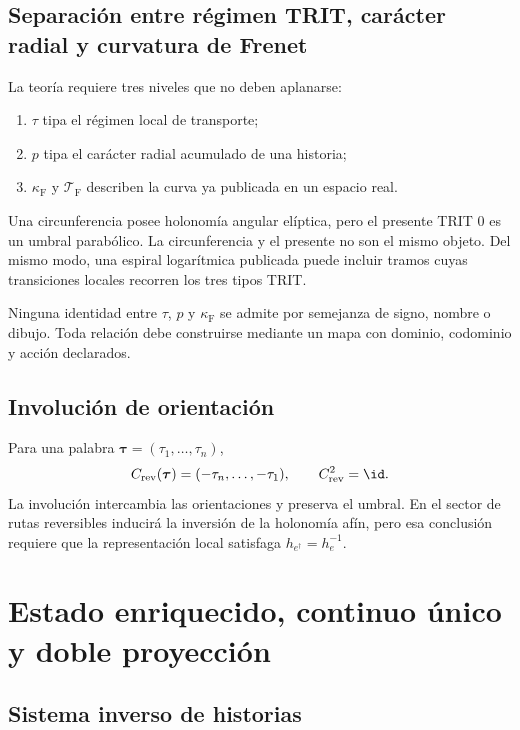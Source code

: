 \section{Separación entre régimen TRIT, carácter radial y curvatura de Frenet}

La teoría requiere tres niveles que no deben aplanarse:
\begin{enumerate}
\item \(\tau\) tipa el régimen local de transporte;
\item \(p\) tipa el carácter radial acumulado de una historia;
\item \(\kappa_{\mathrm{F}}\) y \(\mathcal T_{\mathrm{F}}\) describen la curva ya
publicada en un espacio real.
\end{enumerate}
Una circunferencia posee holonomía angular elíptica, pero el presente TRIT
\(0\) es un umbral parabólico. La circunferencia y el presente no son el
mismo objeto. Del mismo modo, una espiral logarítmica publicada puede incluir
tramos cuyas transiciones locales recorren los tres tipos TRIT.

\begin{principle}
Ninguna identidad entre \(\tau\), \(p\) y \(\kappa_{\mathrm{F}}\) se admite por
semejanza de signo, nombre o dibujo. Toda relación debe construirse mediante
un mapa con dominio, codominio y acción declarados.
\end{principle}

\section{Involución de orientación}

Para una palabra \(\boldsymbol\tau=(\tau_1,\ldots,\tau_n)\),
\[
 C_{\mathrm{rev}}(\boldsymbol\tau)
 =(-\tau_n,\ldots,-\tau_1),
 \qquad C_{\mathrm{rev}}^2=\id.
\]
La involución intercambia las orientaciones y preserva el umbral. En el
sector de rutas reversibles inducirá la inversión de la holonomía afín, pero
esa conclusión requiere que la representación local satisfaga
\(h_{e^\dagger}=h_e^{-1}\).

\chapter{Estado enriquecido, continuo único y doble proyección}

\section{Sistema inverso de historias}

